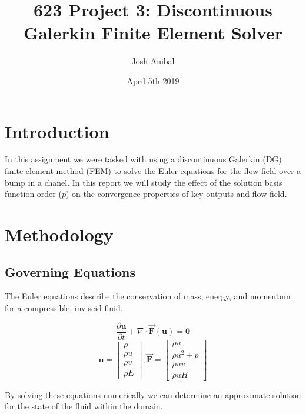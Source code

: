 \documentclass{article}
\title{623 Project 3: Discontinuous Galerkin Finite Element Solver}
\author{Josh Anibal}
\date{April 5th 2019}
\begin{document}
\label{Eqn:DE}
\maketitle

\section*{Introduction}
In this assignment we were tasked with using a discontinuous Galerkin (DG) finite element method (FEM) to solve the Euler equations for the flow field over a bump in a chanel.
In this report we will study the effect of the solution basis function order ($p$) on the convergence properties of key outputs and flow field.



\section{Methodology}

\subsection{Governing Equations}
	The Euler equations describe the conservation of mass, energy, and momentum for a compressible, inviscid fluid.



	\begin{equation}
		\frac{\partial \mathcal{\mathbf{u} }}   {\partial t}
		+ \nabla   \cdot \vec{\mathbf{F}}(\mathbf{u})  = \mathbf{0}
		\label{eqn:Euler}
	\end{equation}
	\begin{equation*}
		\mathbf{u} =
		\begin{bmatrix}
			\rho \\ \rho u \\ \rho v \\ \rho E
		\end{bmatrix}
		,
		\mathbf{\vec{F}} =
		\begin{bmatrix}
			\rho u \\ \rho u^2 + p \\ \rho uv \\ \rho u H
		\end{bmatrix}
	\end{equation*}

	By solving these equations numerically we can determine an approximate solution for the state of the fluid within the domain.
\end{document}
